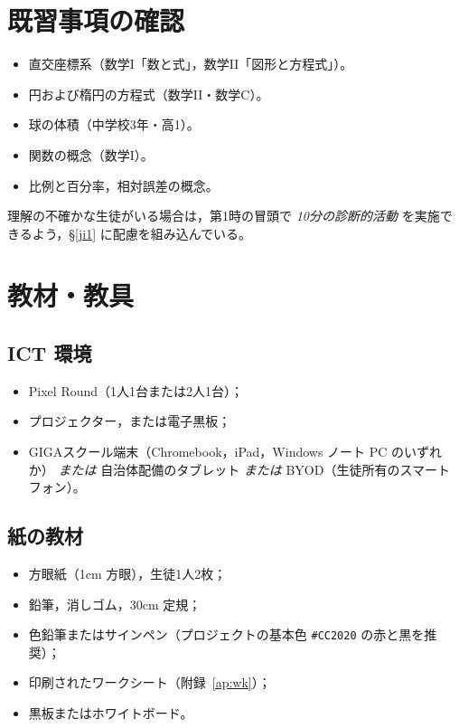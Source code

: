 \documentclass[12pt,a4paper]{scrartcl}
\begin{document}
\section{既習事項の確認}

\begin{itemize}[leftmargin=1.3em,itemsep=0.15em,topsep=0.3em]
  \item 直交座標系（数学I「数と式」，数学II「図形と方程式」）。
  \item 円および楕円の方程式（数学II・数学C）。
  \item 球の体積（中学校3年・高1）。
  \item 関数の概念（数学I）。
  \item 比例と百分率，相対誤差の概念。
\end{itemize}

理解の不確かな生徒がいる場合は，第1時の冒頭で \emph{10分の診断的活動} を実施できるよう，§\ref{ji1} に配慮を組み込んでいる。

\section{教材・教具}

\subsection{ICT 環境}
\begin{itemize}[leftmargin=1.3em,itemsep=0.15em,topsep=0.3em]
  \item Pixel Round（1人1台または2人1台）；
  \item プロジェクター，または電子黒板；
  \item GIGAスクール端末（Chromebook，iPad，Windows ノート PC のいずれか） \emph{または} 自治体配備のタブレット \emph{または} BYOD（生徒所有のスマートフォン）。
\end{itemize}

\subsection{紙の教材}
\begin{itemize}[leftmargin=1.3em,itemsep=0.15em,topsep=0.3em]
  \item 方眼紙（1cm 方眼），生徒1人2枚；
  \item 鉛筆，消しゴム，30cm 定規；
  \item 色鉛筆またはサインペン（プロジェクトの基本色 \texttt{\#CC2020} の赤と黒を推奨）；
  \item 印刷されたワークシート（附録~\ref{ap:wk}）；
  \item 黒板またはホワイトボード。
\end{itemize}
\end{document}
